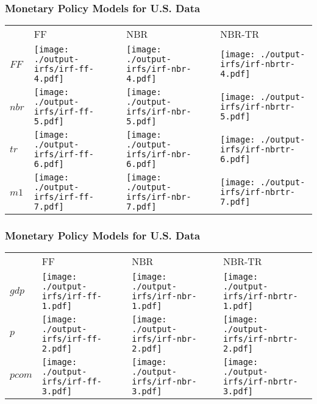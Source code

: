 \documentclass[notes,blackandwhite,mathsans,usenames,dvipsnames]{beamer}
\begin{document}
\begin{frame}
	\frametitle{Monetary Policy Models for  U.S. Data}


\begin{center}\small
\begin{tabular}{m{0.5cm} m{2.8cm} m{2.8cm} m{3.3cm}}
& FF  & NBR  & NBR-TR\\
$FF$& \texttt{[image: ./output-irfs/irf-ff-4.pdf]} &\texttt{[image: ./output-irfs/irf-nbr-4.pdf]} & \texttt{[image: ./output-irfs/irf-nbrtr-4.pdf]}\\
$nbr$& \texttt{[image: ./output-irfs/irf-ff-5.pdf]} &\texttt{[image: ./output-irfs/irf-nbr-5.pdf]} & \texttt{[image: ./output-irfs/irf-nbrtr-5.pdf]}\\
$tr$& \texttt{[image: ./output-irfs/irf-ff-6.pdf]} &\texttt{[image: ./output-irfs/irf-nbr-6.pdf]} & \texttt{[image: ./output-irfs/irf-nbrtr-6.pdf]}\\
$m1$& \texttt{[image: ./output-irfs/irf-ff-7.pdf]} &\texttt{[image: ./output-irfs/irf-nbr-7.pdf]} & \texttt{[image: ./output-irfs/irf-nbrtr-7.pdf]}
\end{tabular}
\end{center}

\end{frame}




\begin{frame}
	\frametitle{Monetary Policy Models for  U.S. Data}

\begin{center}\small
\begin{tabular}{m{0.5cm} m{2.8cm} m{2.8cm} m{3.3cm}}
& FF  & NBR  & NBR-TR\\
$gdp$ & \texttt{[image: ./output-irfs/irf-ff-1.pdf]} &\texttt{[image: ./output-irfs/irf-nbr-1.pdf]} & \texttt{[image: ./output-irfs/irf-nbrtr-1.pdf]}\\
$p$& \texttt{[image: ./output-irfs/irf-ff-2.pdf]} &\texttt{[image: ./output-irfs/irf-nbr-2.pdf]} & \texttt{[image: ./output-irfs/irf-nbrtr-2.pdf]}\\
$pcom$& \texttt{[image: ./output-irfs/irf-ff-3.pdf]} &\texttt{[image: ./output-irfs/irf-nbr-3.pdf]} & \texttt{[image: ./output-irfs/irf-nbrtr-3.pdf]}
\end{tabular}
\end{center}

\end{frame}
\end{document}
